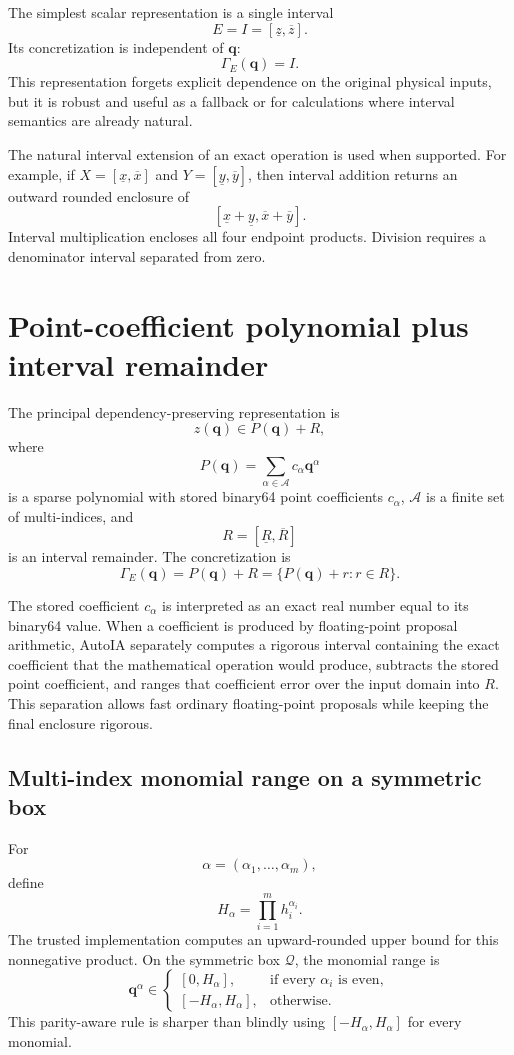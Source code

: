 \documentclass[11pt]{article}
\newcommand{\Qdom}{\mathcal{Q}}
\newcommand{\qv}{\mathbf{q}}
\begin{document}
The simplest scalar representation is a single interval
\[
  E=I=[\underline z,\overline z].
\]
Its concretization is independent of \(\qv\):
\[
  \Gamma_E(\qv)=I.
\]
This representation forgets explicit dependence on the original physical inputs,
but it is robust and useful as a fallback or for calculations where interval
semantics are already natural.

The natural interval extension of an exact operation is used when supported.  For
example, if \(X=[\underline x,\overline x]\) and
\(Y=[\underline y,\overline y]\), then interval addition returns an outward
rounded enclosure of
\[
  [\underline x+\underline y,\overline x+\overline y].
\]
Interval multiplication encloses all four endpoint products.  Division requires
a denominator interval separated from zero.

\section{Point-coefficient polynomial plus interval remainder}

The principal dependency-preserving representation is
\[
  \boxed{
  z(\qv)\in P(\qv)+R,
  }
\]
where
\[
  P(\qv)=\sum_{\alpha\in\mathcal{A}} c_\alpha\qv^\alpha
\]
is a sparse polynomial with stored binary64 point coefficients \(c_\alpha\),
\(\mathcal{A}\) is a finite set of multi-indices, and
\[
  R=[\underline R,\overline R]
\]
is an interval remainder.  The concretization is
\[
  \Gamma_E(\qv)=P(\qv)+R
  =\{P(\qv)+r:r\in R\}.
\]

The stored coefficient \(c_\alpha\) is interpreted as an exact real number equal
to its binary64 value.  When a coefficient is produced by floating-point proposal
arithmetic, AutoIA separately computes a rigorous interval containing the exact
coefficient that the mathematical operation would produce, subtracts the stored
point coefficient, and ranges that coefficient error over the input domain into
\(R\).  This separation allows fast ordinary floating-point proposals while
keeping the final enclosure rigorous.

\subsection{Multi-index monomial range on a symmetric box}

For
\[
  \alpha=(\alpha_1,\ldots,\alpha_m),
\]
define
\[
  H_\alpha=\prod_{i=1}^m h_i^{\alpha_i}.
\]
The trusted implementation computes an upward-rounded upper bound for this
nonnegative product.  On the symmetric box \(\Qdom\), the monomial range is
\[
  \qv^\alpha\in
  \begin{cases}
    [0,H_\alpha], & \text{if every }\alpha_i\text{ is even},\\
    [-H_\alpha,H_\alpha], & \text{otherwise}.
  \end{cases}
\]
This parity-aware rule is sharper than blindly using \([-H_\alpha,H_\alpha]\)
for every monomial.
\end{document}
